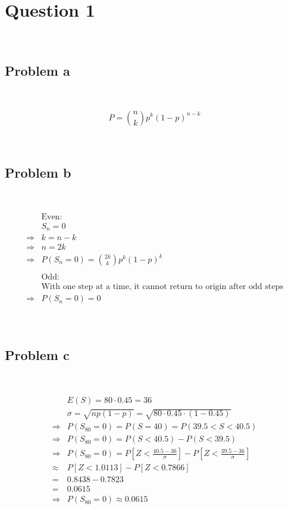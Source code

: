 \documentclass{article}
\begin{document}
\section*{Question 1}

~

\subsection*{Problem a}

~

\begin{equation*}
    P=\binom{n}{k}p^k(1-p)^{n-k}
\end{equation*}

~

\subsection*{Problem b}

~

\begin{equation*}
    \begin{split}
        &\text{Even}:\\
        &S_n=0\\
        \Rightarrow&k=n-k\\
        \Rightarrow&n=2k\\
        \Rightarrow&P(S_n=0)=\binom{2k}{k}p^k(1-p)^k\\
        &\\
        &\text{Odd}:\\
        &\text{With one step at a time, it cannot return to origin after odd steps}\\
        \Rightarrow&P(S_n=0)=0\\
    \end{split}
\end{equation*}

~

\subsection*{Problem c}

~

\begin{equation*}
    \begin{split}
        &E(S)=80\cdot0.45=36\\
        &\sigma=\sqrt{np(1-p)}=\sqrt{80\cdot0.45\cdot(1-0.45)}\\
        \Rightarrow&P(S_{80}=0)=P(S=40)=P(39.5<S<40.5)\\
        \Rightarrow&P(S_{80}=0)=P(S<40.5)-P(S<39.5)\\
        \Rightarrow&P(S_{80}=0)=P[Z<\frac{40.5-36}{\sigma}]-P[Z<\frac{39.5-36}{\sigma}]\\
        \approx&P[Z<1.0113]-P[Z<0.7866]\\
        =& 0.8438 - 0.7823\\
        =&0.0615\\
        \Rightarrow&P(S_{80}=0)\approx0.0615\\
    \end{split}
\end{equation*}
\end{document}

